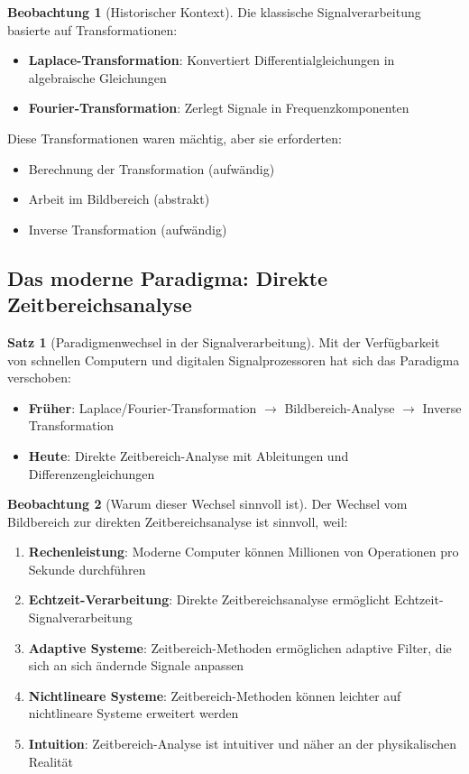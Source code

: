 ﻿\documentclass[a4paper,12pt]{report}
\theoremstyle{definition}
\newtheorem{satz}{Satz}
\newtheorem{beobachtung}{Beobachtung}
\begin{document}
	\begin{beobachtung}[Historischer Kontext]
		Die klassische Signalverarbeitung basierte auf Transformationen:
		\begin{itemize}
			\item[-] \textbf{Laplace-Transformation}: Konvertiert Differentialgleichungen in algebraische Gleichungen
			\item[-] \textbf{Fourier-Transformation}: Zerlegt Signale in Frequenzkomponenten
		\end{itemize}
		
		Diese Transformationen waren mächtig, aber sie erforderten:
		\begin{itemize}
			\item[-] Berechnung der Transformation (aufwändig)
			\item[-] Arbeit im Bildbereich (abstrakt)
			\item[-] Inverse Transformation (aufwändig)
		\end{itemize}
	\end{beobachtung}
	
	\subsection{Das moderne Paradigma: Direkte Zeitbereichsanalyse}
	
	\begin{satz}[Paradigmenwechsel in der Signalverarbeitung]
		Mit der Verfügbarkeit von schnellen Computern und digitalen Signalprozessoren hat sich das Paradigma verschoben:
		\begin{itemize}
			\item[-] \textbf{Früher}: Laplace/Fourier-Transformation $\to$ Bildbereich-Analyse $\to$ Inverse Transformation
			\item[-] \textbf{Heute}: Direkte Zeitbereich-Analyse mit Ableitungen und Differenzengleichungen
		\end{itemize}
	\end{satz}
	
	\begin{beobachtung}[Warum dieser Wechsel sinnvoll ist]
		
		Der Wechsel vom Bildbereich zur direkten Zeitbereichsanalyse ist sinnvoll, weil:
		
		\begin{enumerate}
			\item[-] \textbf{Rechenleistung}: Moderne Computer können Millionen von Operationen pro Sekunde durchführen
			\item[-] \textbf{Echtzeit-Verarbeitung}: Direkte Zeitbereichsanalyse ermöglicht Echtzeit-Signal\-verarbeitung
			\item[-] \textbf{Adaptive Systeme}: Zeitbereich-Methoden ermöglichen adaptive Filter, die sich an sich ändernde Signale anpassen
			\item[-] \textbf{Nichtlineare Systeme}: Zeitbereich-Methoden können leichter auf nichtlineare Systeme erweitert werden
			\item[-] \textbf{Intuition}: Zeitbereich-Analyse ist intuitiver und näher an der physikalischen Realität
		\end{enumerate}
	\end{beobachtung}
	
\end{document}
